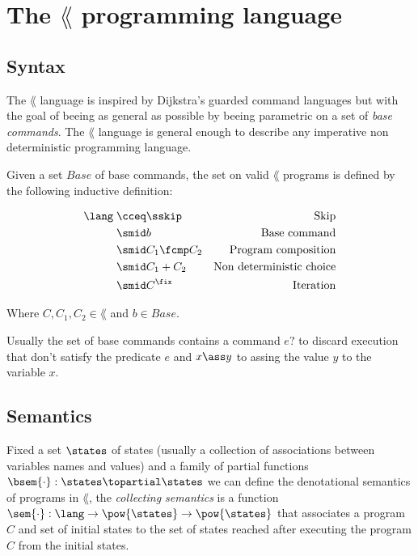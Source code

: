 \section{The $\lang$ programming language}

\subsection{Syntax}

The $\lang$ language is inspired by Dijkstra's guarded command languages
\cite{Dijkstra74} but with the goal of beeing as general as possible by beeing
parametric on a set of \textit{base commands}. The $\lang$ language is general
enough to describe any imperative non deterministic programming language.

\begin{definition}
  Given a set $Base$ of base commands, the set on valid $\lang$ programs is 
  defined by the following inductive definition:

  \begin{align*}
    \lang \; & \cceq \sskip        & \text{Skip}\\
             & \smid b             & \text{Base command}\\
             & \smid C_1 \fcmp C_2 & \text{Program composition}\\
             & \smid C_1 + C_2     & \text{Non deterministic choice}\\
             & \smid C^\fix        & \text{Iteration}\\
  \end{align*}

  Where $C, C_1, C_2 \in \lang$ and $b \in Base$.

  \begin{example} \label{exmp:base-commands-syntax}
    Usually the set of base commands contains a command $e ?$ to discard 
    execution that don't satisfy the predicate $e$ and $x \ass y$ to assing the 
    value $y$ to the variable $x$.
  \end{example}
\end{definition}


\subsection{Semantics}

Fixed a set $\states$ of states (usually a collection of associations between
variables names and values) and a family of partial functions $\bsem{\cdot} 
: \states \topartial \states$ we can define the denotational semantics of programs 
in $\lang$, the \textit{collecting semantics} is a function $\sem{\cdot} : \lang 
\to \pow{\states} \to \pow{\states}$ that associates a program $C$ and set of 
initial states to the set of states reached after executing the program $C$ 
from the initial states.

